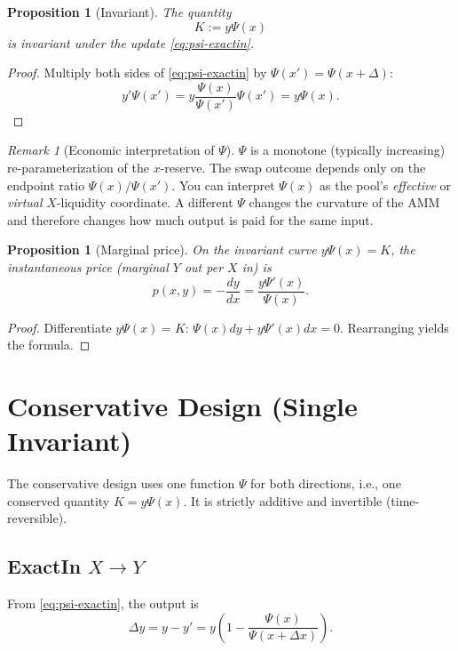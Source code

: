 \documentclass[11pt]{article}
\newtheorem{proposition}[theorem]{Proposition}
\theoremstyle{definition}
\theoremstyle{remark}
\newtheorem{remark}[theorem]{Remark}
\newcommand{\dx}{\Delta x}
\begin{document}
\begin{proposition}[Invariant]
The quantity
\[
\boxed{K:=y\Psi(x)}
\]
is invariant under the update \eqref{eq:psi-exactin}.
\end{proposition}

\begin{proof}
Multiply both sides of \eqref{eq:psi-exactin} by $\Psi(x')=\Psi(x+\Delta)$:
\[
 y'\Psi(x') = y\frac{\Psi(x)}{\Psi(x')}\Psi(x') = y\Psi(x).
\]
\end{proof}

\begin{remark}[Economic interpretation of $\Psi$]
$\Psi$ is a monotone (typically increasing) re-parameterization of the $x$-reserve.
The swap outcome depends only on the endpoint ratio $\Psi(x)/\Psi(x')$.
You can interpret $\Psi(x)$ as the pool's \emph{effective} or \emph{virtual} $X$-liquidity coordinate.
A different $\Psi$ changes the curvature of the AMM and therefore changes how much output is paid for the same input.
\end{remark}

\begin{proposition}[Marginal price]
On the invariant curve $y\Psi(x)=K$, the instantaneous price (marginal $Y$ out per $X$ in) is
\[
\boxed{p(x,y)=-\frac{dy}{dx} = \frac{y\Psi'(x)}{\Psi(x)}.}
\]
\end{proposition}

\begin{proof}
Differentiate $y\Psi(x)=K$:
$\Psi(x)dy + y\Psi'(x)dx =0$. Rearranging yields the formula.
\end{proof}

\section{Conservative Design (Single Invariant)}

The conservative design uses one function $\Psi$ for both directions, i.e., one conserved quantity $K=y\Psi(x)$. It is strictly additive and invertible (time-reversible).

\subsection{ExactIn $X\to Y$}

From \eqref{eq:psi-exactin}, the output is
\begin{equation}
\boxed{\;\Delta y = y-y' = y\left(1-\frac{\Psi(x)}{\Psi(x+\dx)}\right).\;}
\label{eq:curveA-exactin-out}
\end{equation}
\end{document}
